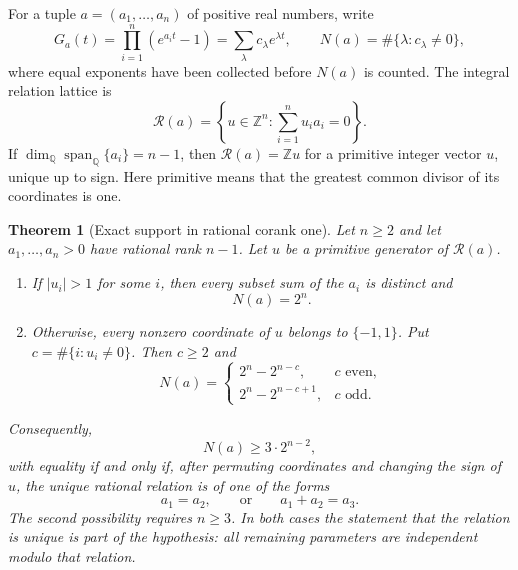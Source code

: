 \documentclass[11pt]{article}
\newtheorem{theorem}{Theorem}[section]
\theoremstyle{definition}
\theoremstyle{remark}
\numberwithin{equation}{section}
\begin{document}
For a tuple $a=(a_1,\ldots,a_n)$ of positive real numbers, write
\[
 G_a(t)=\prod_{i=1}^n(e^{a_i t}-1)
       =\sum_{\lambda}c_\lambda e^{\lambda t},
 \qquad
 N(a)=\#\{\lambda:c_\lambda\ne0\},
\]
where equal exponents have been collected before $N(a)$ is counted.
The integral relation lattice is
\[
 \mathcal R(a)=
 \left\{u\in\mathbb Z^n:\sum_{i=1}^n u_i a_i=0\right\}.
\]
If $\dim_{\mathbb Q}\operatorname{span}_{\mathbb Q}\{a_i\}=n-1$,
then $\mathcal R(a)=\mathbb Z u$ for a primitive integer vector $u$,
unique up to sign. Here primitive means that the greatest common divisor
of its coordinates is one.

\begin{theorem}[Exact support in rational corank one]
\label{thm:corank-one}
Let $n\ge2$ and let $a_1,\ldots,a_n>0$ have rational rank $n-1$.
Let $u$ be a primitive generator of $\mathcal R(a)$.
\begin{enumerate}
\item If $|u_i|>1$ for some $i$, then every subset sum of the $a_i$ is
distinct and
\[
 N(a)=2^n.
\]
\item Otherwise, every nonzero coordinate of $u$ belongs to
$\{-1,1\}$. Put $c=\#\{i:u_i\ne0\}$. Then $c\ge2$ and
\begin{equation}
\label{eq:corank-one-support}
 N(a)=
 \begin{cases}
  2^n-2^{n-c},&c\text{ even},\\
  2^n-2^{n-c+1},&c\text{ odd}.
 \end{cases}
\end{equation}
\end{enumerate}
Consequently,
\begin{equation}
\label{eq:corank-one-minimum}
 N(a)\ge3\cdot2^{n-2},
\end{equation}
with equality if and only if, after permuting coordinates and changing
the sign of $u$, the unique rational relation is of one of the forms
\[
 a_1=a_2,
 \qquad\text{or}\qquad
 a_1+a_2=a_3.
\]
The second possibility requires $n\ge3$. In both cases the statement
that the relation is unique is part of the hypothesis: all remaining
parameters are independent modulo that relation.
\end{theorem}
\end{document}
